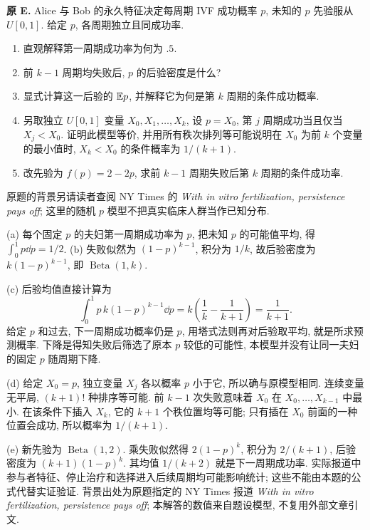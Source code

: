 \begin{exercise}\label{ex:P7.E}
\textbf{原 E.} Alice 与 Bob 的永久特征决定每周期 IVF 成功概率 $p$, 未知的 $p$ 先验服从 $U[0,1]$. 给定 $p$, 各周期独立且同成功率.
\begin{enumerate}[label=(\alph*)]
\item\label{part:P7.E.a} 直观解释第一周期成功率为何为 $.5$.
\item\label{part:P7.E.b} 前 $k-1$ 周期均失败后, $p$ 的后验密度是什么?
\item\label{part:P7.E.c} 显式计算这一后验的 $\mathbb E p$, 并解释它为何是第 $k$ 周期的条件成功概率.
\item\label{part:P7.E.d} 另取独立 $U[0,1]$ 变量 $X_0,X_1,\ldots,X_k$, 设 $p=X_0$, 第 $j$ 周期成功当且仅当 $X_j<X_0$. 证明此模型等价, 并用所有秩次排列等可能说明在 $X_0$ 为前 $k$ 个变量的最小值时, $X_k<X_0$ 的条件概率为 $1/(k+1)$.
\item\label{part:P7.E.e} 改先验为 $f(p)=2-2p$, 求前 $k-1$ 周期失败后第 $k$ 周期的条件成功率.
\end{enumerate}
原题的背景另请读者查阅 NY Times 的 \textit{With in vitro fertilization, persistence pays off}; 这里的随机 $p$ 模型不把真实临床人群当作已知分布.
\end{exercise}
\begin{solution}\label{sol:P7.E}
(a) 每个固定 $p$ 的夫妇第一周期成功率为 $p$, 把未知 $p$ 的可能值平均, 得 $\int_0^1p\dd p=1/2$. (b) 失败似然为 $(1-p)^{k-1}$, 积分为 $1/k$, 故后验密度为 $k(1-p)^{k-1}$, 即 $\operatorname{Beta}(1,k)$.

(c) 后验均值直接计算为
\[
 \int_0^1p\,k(1-p)^{k-1}\dd p
 =k\left(\frac1k-\frac1{k+1}\right)=\frac1{k+1}.
\]
给定 $p$ 和过去, 下一周期成功概率仍是 $p$, 用塔式法则再对后验取平均, 就是所求预测概率. 下降是得知失败后筛选了原本 $p$ 较低的可能性, 本模型并没有让同一夫妇的固定 $p$ 随周期下降.

(d) 给定 $X_0=p$, 独立变量 $X_j$ 各以概率 $p$ 小于它, 所以确与原模型相同. 连续变量无平局, $(k+1)!$ 种排序等可能. 前 $k-1$ 次失败意味着 $X_0$ 在 $X_0,\ldots,X_{k-1}$ 中最小. 在该条件下插入 $X_k$, 它的 $k+1$ 个秩位置均等可能; 只有插在 $X_0$ 前面的一种位置会成功, 所以概率为 $1/(k+1)$.

(e) 新先验为 $\operatorname{Beta}(1,2)$. 乘失败似然得 $2(1-p)^k$, 积分为 $2/(k+1)$, 后验密度为 $(k+1)(1-p)^k$. 其均值 $1/(k+2)$ 就是下一周期成功率. 实际报道中参与者特征、停止治疗和选择进入后续周期均可能影响统计; 这些不能由本题的公式代替实证验证. 背景出处为原题指定的 NY Times 报道 \textit{With in vitro fertilization, persistence pays off}; 本解答的数值来自题设模型, 不复用外部文章引文.
\end{solution}

